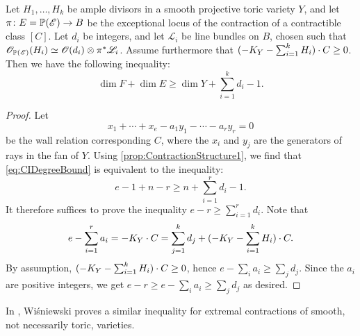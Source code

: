\begin{proposition}
	\label{prop:SumDegreesBound}
	Let $H_1, \dots, H_k$ be ample divisors in a smooth projective toric variety $Y$, and let $\pi \colon E = \mathbb{P}(\mathscr{E}) \to B$ be the exceptional locus of the contraction of a contractible class $[C]$. Let $d_i$ be integers, and let $\mathscr{L}_i$ be line bundles on $B$, chosen such that $\mathscr{O}_{\mathbb{P}(\mathscr{E})}(H_i) \simeq \mathscr{O}(d_i) \otimes \pi^*\mathscr{L}_i$. Assume furthermore that $(-K_Y - \sum_{i=1}^k H_i) \cdot C \geq 0$. Then we have the following inequality: 
	\begin{equation}
		\label{eq:CIDegreeBound}
		\dim F + \dim E \geq \dim Y + \sum_{i=1}^k d_i -1.
	\end{equation}
	
\end{proposition}
\begin{proof}
  	 Let
  	\[x_1 + \cdots + x_e - a_1 y_1 - \cdots - a_r y_r =0 \]
  	be the wall relation corresponding $C$,
  	where the $x_i$ and $y_j$ are the generators of rays in the fan of $Y$. Using \cref{prop:ContractionStructure1}, we find that \eqref{eq:CIDegreeBound} is equivalent to the inequality:
	\[e-1 + n - r  \geq n + \sum_{i=1}^r d_i - 1. \]
	It therefore suffices to prove the inequality $e-r \geq \sum_{i=1}^rd_i$. Note that
	\[ e - \sum_{i=1}^r a_i = -K_Y \cdot C = \sum_{j=1}^k d_j + (-K_Y - \sum_{i=1}^k H_i) \cdot C. \]
	By assumption, $(-K_Y - \sum_{i=1}^k H_i) \cdot C \geq 0$, hence $e-\sum_i a_i \geq \sum_j d_j$. Since the $a_i$ are positive integers, we get $e-r \geq e-\sum_i a_i \geq \sum_j d_j$ as desired.
\end{proof}

\begin{remark}
	In \cite{Wis91}, Wi\'{s}niewski proves a similar inequality for extremal contractions of smooth, not necessarily toric, varieties.
\end{remark}

